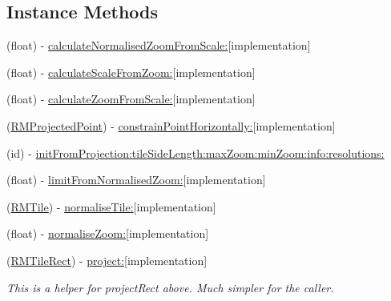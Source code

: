 \subsection*{Instance Methods}
\begin{DoxyCompactItemize}
\item 
(float) -\/ \hyperlink{interface_r_m_s_m_tile_projection_aba4de218e94a607507926e279e149a7a}{calculate\-Normalised\-Zoom\-From\-Scale\-:}{\ttfamily  \mbox{[}implementation\mbox{]}}
\item 
(float) -\/ \hyperlink{interface_r_m_s_m_tile_projection_a94301528cc8b93a91910b955bc149946}{calculate\-Scale\-From\-Zoom\-:}{\ttfamily  \mbox{[}implementation\mbox{]}}
\item 
(float) -\/ \hyperlink{interface_r_m_s_m_tile_projection_abec26590a653146faa9faa3dcc26faf9}{calculate\-Zoom\-From\-Scale\-:}{\ttfamily  \mbox{[}implementation\mbox{]}}
\item 
(\hyperlink{struct_r_m_projected_point}{R\-M\-Projected\-Point}) -\/ \hyperlink{interface_r_m_s_m_tile_projection_a09cdcdb2e897909c3f22b330c7667d48}{constrain\-Point\-Horizontally\-:}{\ttfamily  \mbox{[}implementation\mbox{]}}
\item 
(id) -\/ \hyperlink{interface_r_m_s_m_tile_projection_a77c16d194ed35ef8aeccacd92f150cc7}{init\-From\-Projection\-:tile\-Side\-Length\-:max\-Zoom\-:min\-Zoom\-:info\-:resolutions\-:}
\item 
(float) -\/ \hyperlink{interface_r_m_s_m_tile_projection_a2d3e324bd351cef1ab0239373becd46c}{limit\-From\-Normalised\-Zoom\-:}{\ttfamily  \mbox{[}implementation\mbox{]}}
\item 
(\hyperlink{struct_r_m_tile}{R\-M\-Tile}) -\/ \hyperlink{interface_r_m_s_m_tile_projection_afb0bc6d1a3c82c27cf704689e9afb349}{normalise\-Tile\-:}{\ttfamily  \mbox{[}implementation\mbox{]}}
\item 
(float) -\/ \hyperlink{interface_r_m_s_m_tile_projection_a36e33099f7112bc3a9e2a6d899f31763}{normalise\-Zoom\-:}{\ttfamily  \mbox{[}implementation\mbox{]}}
\item 
(\hyperlink{struct_r_m_tile_rect}{R\-M\-Tile\-Rect}) -\/ \hyperlink{interface_r_m_s_m_tile_projection_a5a6e55b1fd17c79125d4d5fe7db20284}{project\-:}{\ttfamily  \mbox{[}implementation\mbox{]}}
\begin{DoxyCompactList}\small\item\em This is a helper for project\-Rect above. Much simpler for the caller. \end{DoxyCompactList}\item 

\end{DoxyCompactItemize}
